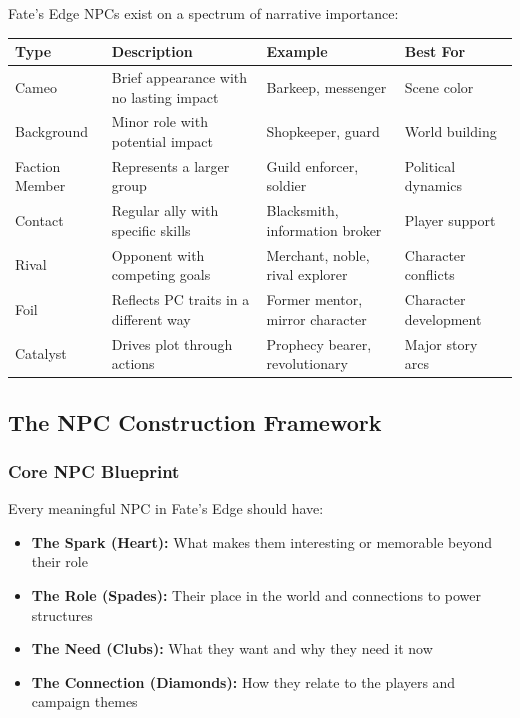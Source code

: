 \documentclass[10pt]{article}
\begin{document}
Fate's Edge NPCs exist on a spectrum of narrative importance:

\begin{center}
\begin{tabular}{|p{}|p{}|p{}|p{}|}
\hline
\textbf{Type} & \textbf{Description} & \textbf{Example} & \textbf{Best For} \\ \hline
Cameo & Brief appearance with no lasting impact & Barkeep, messenger & Scene color \\ \hline
Background & Minor role with potential impact & Shopkeeper, guard & World building \\ \hline
Faction Member & Represents a larger group & Guild enforcer, soldier & Political dynamics \\ \hline
Contact & Regular ally with specific skills & Blacksmith, information broker & Player support \\ \hline
Rival & Opponent with competing goals & Merchant, noble, rival explorer & Character conflicts \\ \hline
Foil & Reflects PC traits in a different way & Former mentor, mirror character & Character development \\ \hline
Catalyst & Drives plot through actions & Prophecy bearer, revolutionary & Major story arcs \\ \hline
\end{tabular}
\end{center}

\subsection{The NPC Construction Framework}

\subsubsection{Core NPC Blueprint}

Every meaningful NPC in Fate's Edge should have:

\begin{itemize}
  \item \textbf{The Spark (Heart):} What makes them interesting or memorable beyond their role
  \item \textbf{The Role (Spades):} Their place in the world and connections to power structures
  \item \textbf{The Need (Clubs):} What they want and why they need it now
  \item \textbf{The Connection (Diamonds):} How they relate to the players and campaign themes
\end{itemize}
\end{document}
